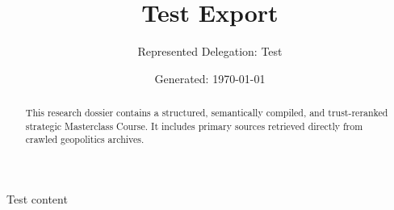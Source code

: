\documentclass[11pt,a4paper]{article}
\title{Test Export}
\author{Represented Delegation: Test}
\date{Generated: \today}
\begin{document}
\maketitle

\begin{abstract}
This research dossier contains a structured, semantically compiled, and trust-reranked strategic Masterclass Course. It includes primary sources retrieved directly from crawled geopolitics archives.
\end{abstract}

\vspace{2em}

Test content
\end{document}
